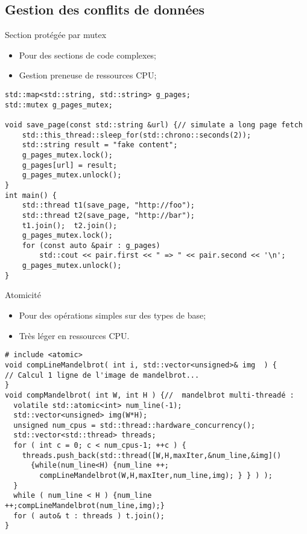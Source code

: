 \documentclass[handout,francais]{beamer}
\begin{document}
\subsection{Gestion des conflits de données}

\begin{frame}[fragile]{Section protégée par mutex}

{\scriptsize
\begin{itemize}
 \item Pour des sections de code complexes;
 \item Gestion preneuse de ressources CPU;
\end{itemize}
}

\begin{lstlisting}
std::map<std::string, std::string> g_pages;
std::mutex g_pages_mutex;
 
void save_page(const std::string &url) {// simulate a long page fetch
    std::this_thread::sleep_for(std::chrono::seconds(2));
    std::string result = "fake content";
    g_pages_mutex.lock();
    g_pages[url] = result;
    g_pages_mutex.unlock();
}
int main() {
    std::thread t1(save_page, "http://foo");
    std::thread t2(save_page, "http://bar");
    t1.join();  t2.join(); 
    g_pages_mutex.lock();
    for (const auto &pair : g_pages) 
        std::cout << pair.first << " => " << pair.second << '\n';
    g_pages_mutex.unlock();
}
\end{lstlisting}

\end{frame}

\begin{frame}[fragile]{Atomicité}

\begin{itemize}
 \item Pour des opérations simples sur des types de base;
 \item Très léger en ressources CPU.
\end{itemize}

\begin{lstlisting}
# include <atomic>
void compLineMandelbrot( int i, std::vector<unsigned>& img  ) {
// Calcul 1 ligne de l'image de mandelbrot...
}
void compMandelbrot( int W, int H ) {//  mandelbrot multi-threadé :
  volatile std::atomic<int> num_line(-1);
  std::vector<unsigned> img(W*H);
  unsigned num_cpus = std::thread::hardware_concurrency();
  std::vector<std::thread> threads;
  for ( int c = 0; c < num_cpus-1; ++c ) {
    threads.push_back(std::thread([W,H,maxIter,&num_line,&img]()
      {while(num_line<H) {num_line ++;
        compLineMandelbrot(W,H,maxIter,num_line,img); } } ) );
  }
  while ( num_line < H ) {num_line ++;compLineMandelbrot(num_line,img);}
  for ( auto& t : threads ) t.join();
}
\end{lstlisting}

\end{frame}
\end{document}
